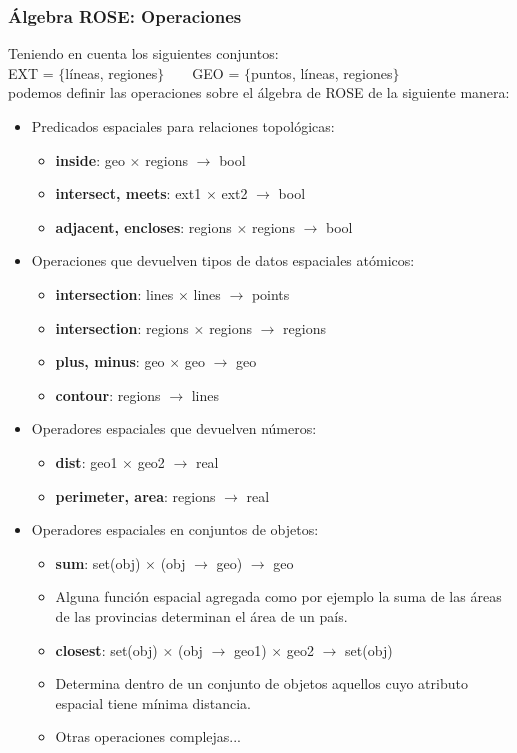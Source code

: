 \documentclass[a4paper,12pt,oneside]{report}
\begin{document}
\subsubsection*{\'Algebra ROSE: Operaciones}
Teniendo en cuenta los siguientes conjuntos:\\EXT = $\lbrace$l\'ineas, regiones$\rbrace$\ \ \ \ GEO = $\lbrace$puntos, l\'ineas, regiones$\rbrace$\\podemos definir las operaciones sobre el \'algebra de ROSE de la siguiente manera:
\begin{itemize}
\item Predicados espaciales para relaciones topol\'ogicas:
\begin{itemize}
\item \textbf{inside}: geo $\times$ regions $\rightarrow$ bool
\item \textbf{intersect, meets}: ext1 $\times$ ext2 $\rightarrow$ bool
\item \textbf{adjacent, encloses}: regions $\times$ regions $\rightarrow$ bool
\end{itemize}
\item Operaciones que devuelven tipos de datos espaciales at\'omicos:
\begin{itemize}
\item \textbf{intersection}: lines $\times$ lines $\rightarrow$ points
\item \textbf{intersection}: regions $\times$ regions $\rightarrow$ regions
\item \textbf{plus, minus}: geo $\times$ geo $\rightarrow$ geo
\item \textbf{contour}: regions $\rightarrow$ lines
\end{itemize}
\end{itemize}
\begin{itemize}
\item Operadores espaciales que devuelven n\'umeros:
\begin{itemize}
\item \textbf{dist}: geo1 $\times$ geo2 $\rightarrow$ real
\item \textbf{perimeter, area}: regions $\rightarrow$ real
\end{itemize}
\item Operadores espaciales en conjuntos de objetos:
\begin{itemize}
\item \textbf{sum}: set(obj) $\times$ (obj $\rightarrow$ geo) $\rightarrow$ geo
\item Alguna funci\'on espacial agregada como por ejemplo la suma de las \'areas de las provincias determinan el \'area de un pa\'is.
\item \textbf{closest}: set(obj) $\times$ (obj $\rightarrow$ geo1) $\times$ geo2 $\rightarrow$ set(obj)
\item Determina dentro de un conjunto de objetos aquellos cuyo atributo espacial tiene m\'inima distancia.
\item Otras operaciones complejas...
\end{itemize}
\end{itemize}
\end{document}
